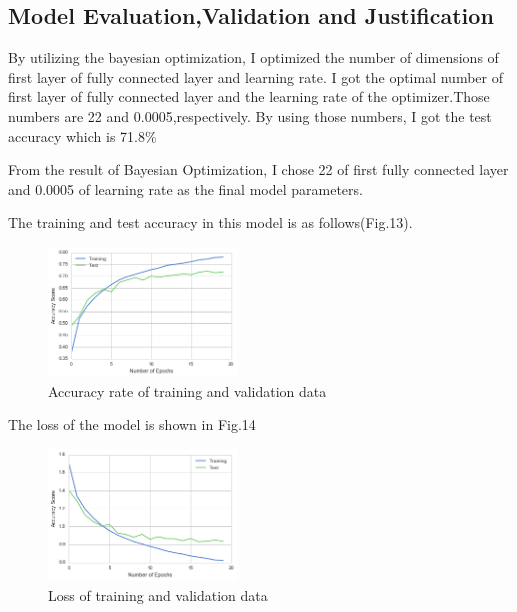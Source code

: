 \subsection{Model Evaluation,Validation and Justification}

By utilizing the bayesian optimization, I optimized the number of dimensions of first layer of fully connected layer and learning rate. I got the optimal number of first layer of fully connected layer and the learning rate of the optimizer.Those numbers are 22 and 0.0005,respectively. By using those numbers, I got the test accuracy which is 71.8\%


From the result of Bayesian Optimization, I chose 22 of first fully connected layer and 0.0005 of learning rate as the final model parameters.


The training and test accuracy in this model is as follows(Fig.13).


\begin{figure}[H]

	\begin{center}
	\includegraphics[width=5cm]{picture/final_model_cnn.png}
	\caption{Accuracy rate of training and validation data}
	\end{center}
	\label{fig:13}

\end{figure}


The loss of the model is shown in Fig.14

 \begin{figure}[H]

	\begin{center}
	\includegraphics[width=5cm]{picture/final_model_loss.png}
	\caption{Loss of training and validation data}
	\end{center}
	\label{fig:14}

\end{figure}



